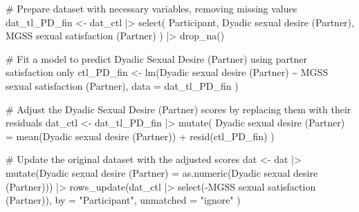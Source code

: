 \documentclass[
  bookmarksnumbered]{article}
\newenvironment{Shaded}{\begin{snugshade}}{\end{snugshade}}
\newcommand{\AttributeTok}[1]{\textcolor[rgb]{0.80,0.80,0.80}{#1}}
\newcommand{\CommentTok}[1]{\textcolor[rgb]{0.50,0.62,0.50}{#1}}
\newcommand{\FunctionTok}[1]{\textcolor[rgb]{0.94,0.94,0.56}{#1}}
\newcommand{\NormalTok}[1]{\textcolor[rgb]{0.80,0.80,0.80}{#1}}
\newcommand{\OtherTok}[1]{\textcolor[rgb]{0.94,0.94,0.56}{#1}}
\newcommand{\SpecialCharTok}[1]{\textcolor[rgb]{0.86,0.64,0.64}{#1}}
\newcommand{\StringTok}[1]{\textcolor[rgb]{0.80,0.58,0.58}{#1}}
\begin{document}
\begin{Shaded}
\begin{Highlighting}[]
\CommentTok{\# Prepare dataset with necessary variables, removing missing values}
\NormalTok{dat\_tl\_PD\_fin }\OtherTok{\textless{}{-}}\NormalTok{ dat\_ctl }\SpecialCharTok{|\textgreater{}}
  \FunctionTok{select}\NormalTok{(}
\NormalTok{    Participant, }\StringTok{\textasciigrave{}}\AttributeTok{Dyadic sexual desire (Partner)}\StringTok{\textasciigrave{}}\NormalTok{,}
    \StringTok{\textasciigrave{}}\AttributeTok{MGSS sexual satisfaction (Partner)}\StringTok{\textasciigrave{}}
\NormalTok{  ) }\SpecialCharTok{|\textgreater{}}
  \FunctionTok{drop\_na}\NormalTok{()}

\CommentTok{\# Fit a model to predict Dyadic Sexual Desire (Partner) using partner satisfaction only}
\NormalTok{ctl\_PD\_fin }\OtherTok{\textless{}{-}} \FunctionTok{lm}\NormalTok{(}\StringTok{\textasciigrave{}}\AttributeTok{Dyadic sexual desire (Partner)}\StringTok{\textasciigrave{}} \SpecialCharTok{\textasciitilde{}} \StringTok{\textasciigrave{}}\AttributeTok{MGSS sexual satisfaction (Partner)}\StringTok{\textasciigrave{}}\NormalTok{,}
  \AttributeTok{data =}\NormalTok{ dat\_tl\_PD\_fin}
\NormalTok{)}

\CommentTok{\# Adjust the Dyadic Sexual Desire (Partner) scores by replacing them with their residuals}
\NormalTok{dat\_ctl }\OtherTok{\textless{}{-}}\NormalTok{ dat\_tl\_PD\_fin }\SpecialCharTok{|\textgreater{}}
  \FunctionTok{mutate}\NormalTok{(}
    \StringTok{\textasciigrave{}}\AttributeTok{Dyadic sexual desire (Partner)}\StringTok{\textasciigrave{}} \OtherTok{=}
      \FunctionTok{mean}\NormalTok{(}\StringTok{\textasciigrave{}}\AttributeTok{Dyadic sexual desire (Partner)}\StringTok{\textasciigrave{}}\NormalTok{) }\SpecialCharTok{+} \FunctionTok{resid}\NormalTok{(ctl\_PD\_fin)}
\NormalTok{  )}

\CommentTok{\# Update the original dataset with the adjusted scores}
\NormalTok{dat }\OtherTok{\textless{}{-}}\NormalTok{ dat }\SpecialCharTok{|\textgreater{}}
  \FunctionTok{mutate}\NormalTok{(}\StringTok{\textasciigrave{}}\AttributeTok{Dyadic sexual desire (Partner)}\StringTok{\textasciigrave{}} \OtherTok{=} \FunctionTok{as.numeric}\NormalTok{(}\StringTok{\textasciigrave{}}\AttributeTok{Dyadic sexual desire (Partner)}\StringTok{\textasciigrave{}}\NormalTok{)) }\SpecialCharTok{|\textgreater{}}
  \FunctionTok{rows\_update}\NormalTok{(dat\_ctl }\SpecialCharTok{|\textgreater{}} \FunctionTok{select}\NormalTok{(}\SpecialCharTok{{-}}\StringTok{\textasciigrave{}}\AttributeTok{MGSS sexual satisfaction (Partner)}\StringTok{\textasciigrave{}}\NormalTok{),}
    \AttributeTok{by =} \StringTok{"Participant"}\NormalTok{, }\AttributeTok{unmatched =} \StringTok{"ignore"}
\NormalTok{  )}
\end{Highlighting}
\end{Shaded}
\end{document}
